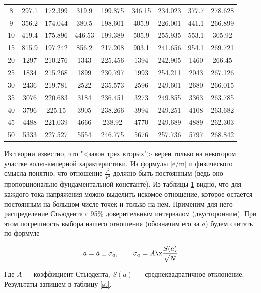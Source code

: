 \documentclass[12pt]{kiarticle} %
\begin{document}
\begin{table}
\begin{tabular}{|c|c|c|c|c|c|c|c|c|}
 8 & 297.1 & 172.399 & 319.9 & 199.875 & 346.15 & 234.023 & 377.7 & 278.628 \\
 9 & 356.2 & 174.044 & 380.5 & 198.601 & 405.9 & 226.001 & 441.1 & 266.899 \\
 10 & 419.4 & 175.896 & 446.53 & 199.389 & 505.9 & 255.935 & 553.1 & 305.92 \\
 15 & 815.9 & 197.242 & 856.2 & 217.208 & 903.1 & 241.656 & 954.1 & 269.721 \\
 20 & 1297 & 210.276 & 1343 & 225.456 & 1394 & 242.905 & 1460 & 266.45 \\
 25 & 1834 & 215.268 & 1899 & 230.797 & 1993 & 254.211 & 2043 & 267.126 \\
 30 & 2436 & 219.781 & 2522 & 235.573 & 2596 & 249.601 & 2680 & 266.015 \\
 35 & 3076 & 220.683 & 3184 & 236.451 & 3273 & 249.855 & 3363 & 263.785 \\
 40 & 3796 & 225.15 & 3905 & 238.266 & 3994 & 249.251 & 4108 & 263.682 \\
 45 & 4488 & 221.039 & 4666 & 238.92 & 4770 & 249.689 & 4889 & 262.303 \\
 50 & 5333 & 227.527 & 5554 & 246.775 & 5676 & 257.736 & 5797 & 268.842 \\
	\hline

\end{tabular}%
\label{res}%
\end{table}%

Из теории известно, что "<закон трех вторых"> верен только на некотором участке вольт-амперной характеристики. Из формулы \eqref{e/m} и физического смысла понятно, что отношение $ \frac{I^2}{V^3} $ должно быть постоянным (ведь оно пропорционально фундаментальной константе). Из таблицы \ref{res} видно, что для каждого тока напряжения можно выделить искомое отношение, которое остается постоянным на большом числе точек и только на нем. Применим для него распределение Стьюдента с 95\% доверительным интервалом (двусторонним). При этом погрешность выбора нашего отношения (обозначим его за $ a $) будем считать по формуле

\begin{equation}\label{sigma}
a = \bar{a} \pm \sigma_a, \qquad \sigma_a = A \x \dfrac{S(a)}{\sqrt{N}}
\end{equation} 

Где $ A $ --- коэффициент Стьюдента, $ S(a) $ --- среднеквадратичное отклонение. Результаты запишем в таблицу \ref{st}.
\end{document}
